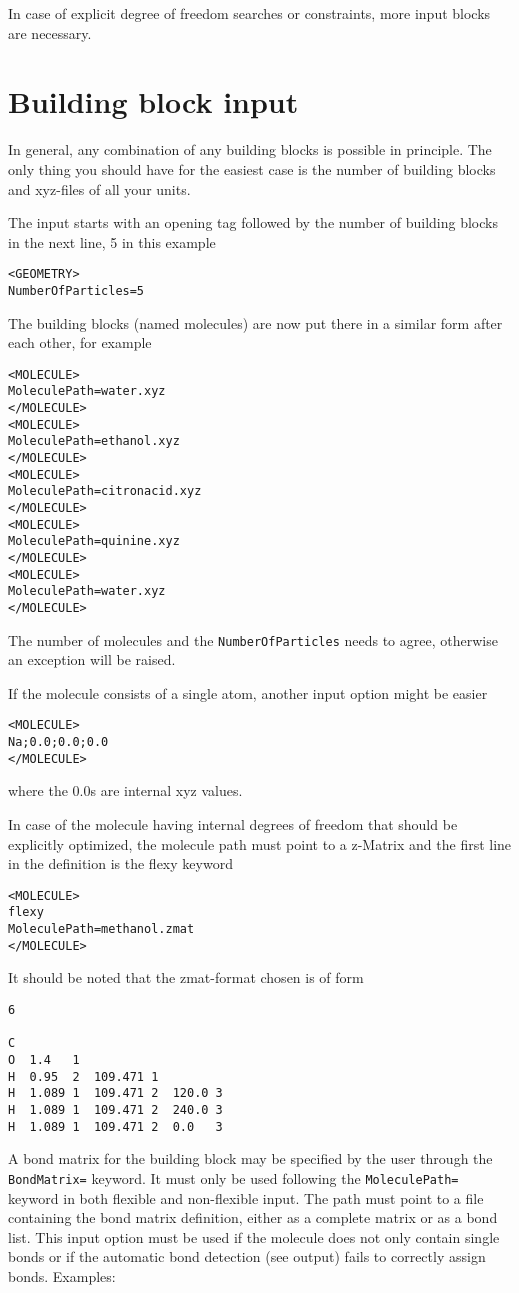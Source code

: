 \documentclass[a4paper,10pt]{scrbook}
\begin{document}
In case of explicit degree of freedom searches or constraints, more input blocks
are necessary.

\section{Building block input}
In general, any combination of any building blocks is possible in principle. The
only thing you should have for the easiest case is the number of building blocks
and xyz-files of all your units.

The input starts with an opening tag followed by the number of building blocks
in the next line, 5 in this example
\begin{verbatim}
<GEOMETRY>
NumberOfParticles=5
\end{verbatim}
The building blocks (named molecules) are now put there in a similar form after
each other, for example
\begin{verbatim}
<MOLECULE>
MoleculePath=water.xyz
</MOLECULE>
<MOLECULE>
MoleculePath=ethanol.xyz
</MOLECULE>
<MOLECULE>
MoleculePath=citronacid.xyz
</MOLECULE>
<MOLECULE>
MoleculePath=quinine.xyz
</MOLECULE>
<MOLECULE>
MoleculePath=water.xyz
</MOLECULE>
\end{verbatim}
The number of molecules and the \texttt{NumberOfParticles} needs to agree,
otherwise an exception will be raised.

If the molecule consists of a single atom, another input option might be easier
\begin{verbatim}
<MOLECULE>
Na;0.0;0.0;0.0
</MOLECULE>
\end{verbatim}
where the 0.0s are internal xyz values.

In case of the molecule having internal degrees of freedom that should be
explicitly optimized, the molecule path must point to a z-Matrix and the
first line in the definition is the flexy keyword
\begin{verbatim}
<MOLECULE>
flexy
MoleculePath=methanol.zmat
</MOLECULE>
\end{verbatim}
It should be noted that the zmat-format chosen is of form
\begin{verbatim}
6

C
O  1.4   1
H  0.95  2  109.471 1
H  1.089 1  109.471 2  120.0 3
H  1.089 1  109.471 2  240.0 3
H  1.089 1  109.471 2  0.0   3
\end{verbatim}

A bond matrix for the building block may be specified by the user through the
\texttt{BondMatrix=} keyword. It must only be used following the
\texttt{MoleculePath=} keyword in both flexible and non-flexible input. The
path must point to a file containing the bond matrix definition, either as a
complete matrix or as a bond list. This input option must be used if the molecule
does not only contain single bonds or if the automatic bond detection (see output)
fails to correctly assign bonds. Examples:
\end{document}

